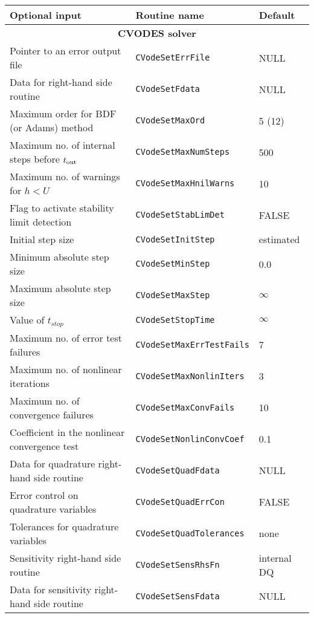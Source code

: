 %
%
\begin{acmtable}{\textwidth}
\centering
\begin{tabularx}{\textwidth}{lll}
{\bf Optional input} & {\bf Routine name} & {\bf Default} \\
\hline
\multicolumn{3}{c}{\bf CVODES solver} \\
\hline
Pointer to an error output file & {\tt CVodeSetErrFile} & NULL  \\
Data for right-hand side routine & {\tt CVodeSetFdata} & NULL \\
Maximum order for BDF (or Adams) method & {\tt CVodeSetMaxOrd} & 5 (12) \\
Maximum no. of internal steps before $t_{\mbox{\scriptsize out}}$ & {\tt CVodeSetMaxNumSteps} & 500 \\
Maximum no. of warnings for $h < U$ & {\tt CVodeSetMaxHnilWarns} & 10 \\
Flag to activate stability limit detection & {\tt CVodeSetStabLimDet} & FALSE \\
Initial step size & {\tt CVodeSetInitStep} & estimated \\
Minimum absolute step size & {\tt CVodeSetMinStep} & 0.0 \\
Maximum absolute step size & {\tt CVodeSetMaxStep} & $\infty$ \\
Value of $t_{stop}$ & {\tt CVodeSetStopTime} & $\infty$ \\
Maximum no. of error test failures & {\tt CVodeSetMaxErrTestFails} & 7 \\
Maximum no. of nonlinear iterations & {\tt CVodeSetMaxNonlinIters} & 3 \\
Maximum no. of convergence failures & {\tt CVodeSetMaxConvFails} & 10 \\
Coefficient in the nonlinear convergence test & {\tt CVodeSetNonlinConvCoef} & 0.1 \\
Data for quadrature right-hand side routine & {\tt CVodeSetQuadFdata} & NULL\\
Error control on quadrature variables & {\tt CVodeSetQuadErrCon} & FALSE \\
Tolerances for quadrature variables & {\tt CVodeSetQuadTolerances} & none \\
Sensitivity right-hand side routine & {\tt CVodeSetSensRhsFn}  & internal DQ  \\
Data for sensitivity right-hand side routine & {\tt CVodeSetSensFdata} & NULL \\

\end{tabularx}
\end{acmtable}
